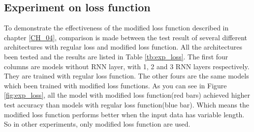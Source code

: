 \subsection{Experiment on loss function}
To demonstrate the effectiveness of the modified loss function described in chapter \ref{CH_04}, comparison is made between the test result of several different architectures with regular loss and modified loss function. All the architectures been tested and the results are listed in Table \ref{tb:exp_loss}. The first four columns are models without RNN layer, with 1, 2 and 3 RNN layers respectively. They are trained with regular loss function. The other fours are the same models which been trained with modified loss functions. As you can see in Figure \ref{fig:exp_loss}, all the model with modified loss function(red bars) achieved higher test accuracy than models with regular loss function(blue bar). Which means the modified loss function performs better when the input data has variable length. So in other experiments, only modified loss function are used.\par 
